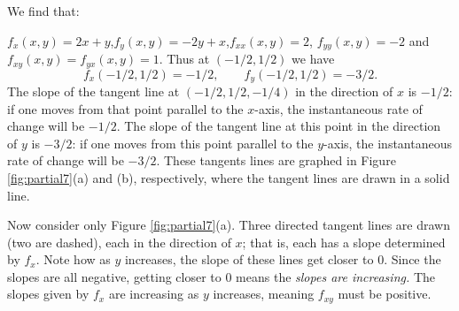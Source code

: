 {We find that:

$f_x(x,y) = 2x+y$,\quad  $f_y(x,y) = -2y+x$,\quad $f_{xx}(x,y) = 2$, \quad $f_{yy}(x,y) = -2$ and $f_{xy}(x,y) = f_{yx}(x,y) = 1$. Thus at $(-1/2,1/2)$ we have 
$$f_x(-1/2,1/2) = -1/2,\qquad f_y(-1/2,1/2) = -3/2.$$
The slope of the tangent line at $(-1/2, 1/2, -1/4)$ in the direction of $x$ is $-1/2$: if one moves from that point parallel to the $x$-axis, the instantaneous rate of change will be $-1/2$. The slope of the tangent line
 at this point in the direction of $y$ is $-3/2$: if one moves from this point parallel to the $y$-axis, the instantaneous rate of change will be $-3/2$. These tangents lines are graphed in Figure \ref{fig:partial7}(a) and (b), respectively, where the tangent lines are drawn in a solid line. 

Now consider only Figure \ref{fig:partial7}(a). Three directed tangent lines are drawn (two are dashed), each in the direction of $x$; that is, each has a slope determined by $f_x$. Note how as $y$ increases, the slope of these lines get closer to $0$. Since the slopes are all negative, getting closer to 0 means the \textit{slopes are increasing.} The slopes given by $f_x$ are increasing as $y$ increases, meaning $f_{xy}$ must be positive. 

}
